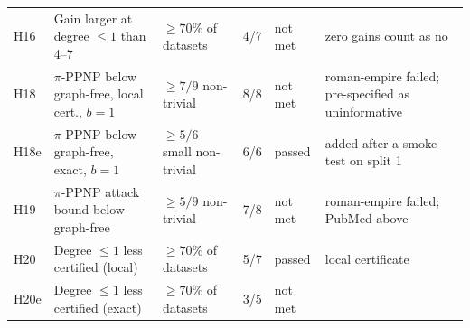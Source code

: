 \begin{table}[!t]
{\begin{tabular}{lllll l}
H16 & Gain larger at degree $\le1$ than 4--7 & $\ge70\%$ of datasets & 4/7 & not met & zero gains count as no \\
H18 & $\pi$-PPNP below graph-free, local cert., $b=1$ & $\ge7/9$ non-trivial & 8/8 & not met & roman-empire failed; pre-specified as uninformative \\
H18e & $\pi$-PPNP below graph-free, exact, $b=1$ & $\ge5/6$ small non-trivial & 6/6 & passed & added after a smoke test on split 1 \\
H19 & $\pi$-PPNP attack bound below graph-free & $\ge5/9$ non-trivial & 7/8 & not met & roman-empire failed; PubMed above \\
H20 & Degree $\le1$ less certified (local) & $\ge70\%$ of datasets & 5/7 & passed & local certificate \\
H20e & Degree $\le1$ less certified (exact) & $\ge70\%$ of datasets & 3/5 & not met &  \\
\bottomrule
\end{tabular}}
\end{table}
